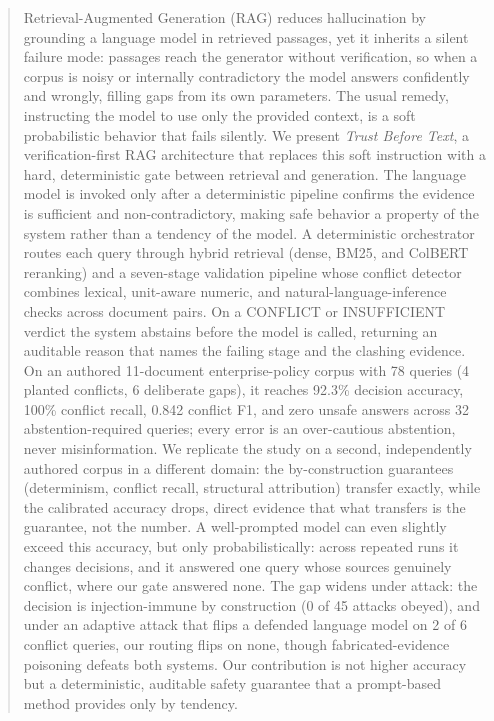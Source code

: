 \documentclass[conference]{IEEEtran}
\begin{document}
\begin{abstract}
Retrieval-Augmented Generation (RAG) reduces hallucination by grounding a
language model in retrieved passages, yet it inherits a silent failure mode:
passages reach the generator without verification, so when a corpus is noisy
or internally contradictory the model answers confidently and wrongly,
filling gaps from its own parameters. The usual remedy, instructing the model
to use only the provided context, is a soft probabilistic behavior that fails
silently. We present \textit{Trust Before Text}, a verification-first RAG
architecture that replaces this soft instruction with a hard, deterministic
gate between retrieval and generation. The language model is invoked only
after a deterministic pipeline confirms the evidence is sufficient and
non-contradictory, making safe behavior a property of the system rather than
a tendency of the model. A deterministic orchestrator routes each query
through hybrid retrieval (dense, BM25, and ColBERT reranking) and a
seven-stage validation pipeline whose conflict detector combines lexical,
unit-aware numeric, and natural-language-inference checks across document
pairs. On a CONFLICT or INSUFFICIENT verdict the system abstains before the
model is called, returning an auditable reason that names the failing stage
and the clashing evidence. On an authored 11-document enterprise-policy
corpus with 78 queries (4 planted conflicts, 6 deliberate gaps), it reaches
92.3\% decision accuracy, 100\% conflict recall, 0.842 conflict F1, and zero
unsafe answers across 32 abstention-required queries; every error is an
over-cautious abstention, never misinformation. We replicate the study on a
second, independently authored corpus in a different domain: the
by-construction guarantees (determinism, conflict recall, structural
attribution) transfer exactly, while the calibrated accuracy drops, direct
evidence that what transfers is the guarantee, not the number. A
well-prompted model can even slightly exceed this accuracy, but only
probabilistically: across
repeated runs it changes decisions, and it answered one query whose sources
genuinely conflict, where our gate answered none. The gap widens under
attack: the decision is injection-immune by construction (0 of 45 attacks
obeyed), and under an adaptive attack that flips a defended language model on
2 of 6 conflict queries, our routing flips on none, though fabricated-evidence
poisoning defeats both systems. Our contribution is not higher accuracy but a
deterministic, auditable safety guarantee that a prompt-based method provides
only by tendency.
\end{abstract}
\end{document}
